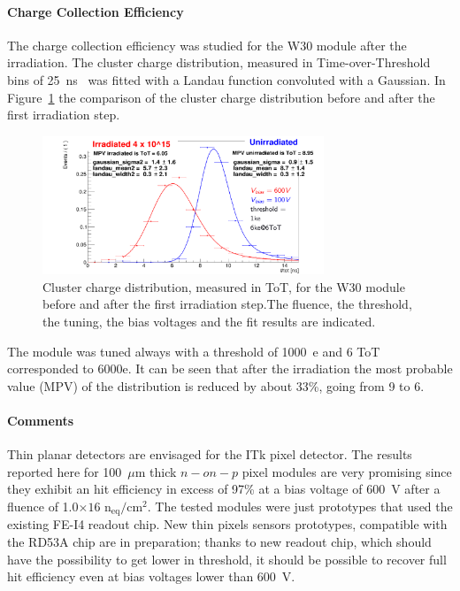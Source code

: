 \paragraph{Charge Collection Efficiency}

The charge collection efficiency was studied for the W30 module after the  irradiation. The cluster charge distribution, measured in Time-over-Threshold bins of 25~ns~\cite{FEI4} was 
fitted with a Landau function convoluted with a Gaussian. In Figure~\ref{fig:IrrCCE} the comparison 
of the cluster charge distribution before and after the first irradiation step.

\begin{figure}[!htpb]
\centering
\includegraphics[width=0.75\textwidth]{IrrCCE.pdf}
\caption{\label{fig:IrrCCE}Cluster charge distribution, measured in ToT,  for the W30 module before and after the first irradiation 
step.The fluence, the threshold, the tuning, the bias voltages and the fit results are indicated.}
\end{figure}

The module was tuned always with a threshold of 1000~e and 6 ToT corresponded to 6000e. 
It can be seen that after the irradiation the most probable value (MPV) of the distribution is reduced 
by about 33\%, going from 9 to 6.

\paragraph{Comments}
Thin planar detectors are envisaged for the ITk pixel detector. The results reported here for 100~$\mu$m 
thick $n-on-p$ pixel modules are very promising since they exhibit an hit efficiency in excess of 
97\% at a bias voltage of 600~V after a fluence of 1.0$\times{16}$ n$_\text{eq}/\text{cm}^2$. The tested 
modules were just 
prototypes that used the existing FE-I4 readout chip. New thin pixels sensors prototypes, compatible 
with the RD53A chip are in preparation; thanks to new readout chip, which should have 
the possibility to get lower in threshold, it should be possible to recover full hit efficiency even at  
bias voltages lower than 600~V. 
 

